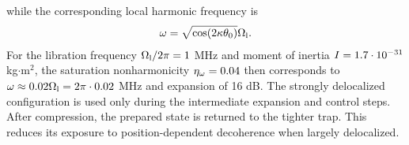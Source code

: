 \documentclass[reprint,prx,footinbib,floatfix,twocolumn,longbibliography,superscriptaddress]{revtex4-2}
\begin{document}
while the corresponding local harmonic frequency is
\begin{align}
    \omega = \sqrt{\cos(2 \kappa \theta_0)} \Omega_{\text{l}}.
\end{align}
For the libration frequency $\Omega_{\text{l}} / 2 \pi = 1$ MHz and moment of inertia $I = 1.7 \cdot 10^{-31}$ kg$\cdot$m$^2$, the saturation nonharmonicity $\eta_\omega = 0.04$ then corresponds to $\omega \approx 0.02 \Omega_{\text{l}} = 2 \pi \cdot  0.02$ MHz and expansion of 16 dB.
The strongly delocalized configuration is used only during the intermediate expansion and control steps.
After compression, the prepared state is returned to the tighter trap.
This reduces its exposure to position-dependent decoherence when largely delocalized.
    
\end{document}
